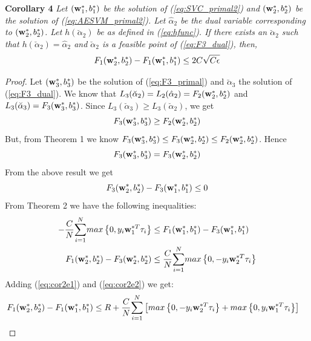 \documentclass[twoside]{article}
\begin{document}
\noindent
{\bf Corollary 4} {\it Let $({\bf w}_1 ^*, b _1 ^*)$ be the solution of (\ref{eq:SVC_primal2}) and $({\bf w}_2 ^*, b _2 ^*)$ be the solution of (\ref{eq:AESVM_primal2}). Let $\hat{\alpha}_2$ be the dual variable corresponding to $({\bf w}_2 ^*, b _2 ^*)$. Let $h(\breve{\alpha}_2)$ be as defined in (\ref{eq:hfunc}). If there exists an $\breve{\alpha}_2$ such that $h(\breve{\alpha}_2) = \hat{\alpha}_2$ and $\breve{\alpha}_2$ is a feasible point of (\ref{eq:F3_dual}), then,
\begin{equation*}
F_1 ({\bf w}_2 ^*, b _2 ^*) - F_1 ({\bf w}_1 ^*, b _1 ^*) \le 2C\sqrt{C\epsilon}
\end{equation*}}

\begin{proof}
Let $({\bf w}_3 ^*, b _3 ^*)$ be the solution of (\ref{eq:F3_primal}) and $\breve{\alpha}_3$ the solution of (\ref{eq:F3_dual}). We know that $L_3(\breve{\alpha}_2) = L_2(\hat{\alpha}_2) = F_2 ({\bf w}_2 ^*, b _2 ^*)$ and $L_3(\breve{\alpha}_3) = F_3 ({\bf w}_3 ^*, b _3 ^*)$. Since $L_3(\breve{\alpha}_3) \ge L_3(\breve{\alpha}_2)$, we get
\begin{equation*}
F_3 ({\bf w}_3 ^*, b _3 ^*) \ge F_2 ({\bf w}_2 ^*, b _2 ^*)
\end{equation*}
But, from Theorem 1 we know $F_3 ({\bf w}_3 ^*, b _3 ^*) \le F_3 ({\bf w}_2 ^*, b _2 ^*) \le F_2 ({\bf w}_2 ^*, b _2 ^*)$. Hence
\begin{equation*}
F_3 ({\bf w}_3 ^*, b _3 ^*) = F_3 ({\bf w}_2 ^*, b _2 ^*)
\end{equation*}
From the above result we get
\begin{equation} \label{eq:cor4e1}
F_3 ({\bf w}_2 ^*, b _2 ^*) - F_3 ({\bf w}_1 ^*, b _1 ^*) \le 0
\end{equation}
From Theorem 2 we have the following inequalities:
\begin{align}
- \frac{C}{N}\overset{N}{\underset{i = 1}{\sum}}max\left\{0, y_{i}\mathbf{w}_1 ^{*T} \tau_i\right\} &\le F_1 ({\bf w}_1 ^*, b _1 ^*) - F_3 ({\bf w}_1 ^*, b _1 ^*) \label{eq:cor2e1}\\
F_1 ({\bf w}_2 ^*, b _2 ^*) - F_3 ({\bf w}_2 ^*, b _2 ^*) &\le \frac{C}{N}\overset{N}{\underset{i = 1}{\sum}}max\left\{0, -y_{i}\mathbf{w}_2 ^{*T} \tau_i\right\} \label{eq:cor2e2}
\end{align}
Adding (\ref{eq:cor2e1}) and (\ref{eq:cor2e2}) we get:
\begin{align}
F_1 ({\bf w}_2 ^*, b _2 ^*) - F_1 ({\bf w}_1 ^*, b _1 ^*) &\le R + \frac{C}{N}\overset{N}{\underset{i = 1}{\sum}} \left[ max\left\{0, -y_{i}\mathbf{w}_2 ^{*T} \tau_i\right\} + max\left\{0, y_{i}\mathbf{w}_1 ^{*T} \tau_i\right\} \right]\label{eq:cor2}

\end{align}
\end{proof}
\end{document}
